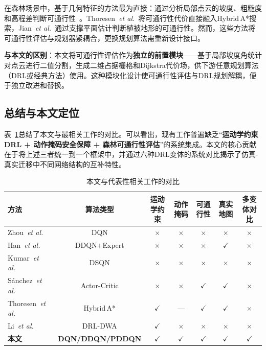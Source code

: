\documentclass[twocolumn]{elsarticle}
\newcommand{\etal}{\textit{et al.}}
\begin{document}
在森林场景中，基于几何特征的方法最为直接：通过分析局部点云的坡度、粗糙度和高程差判断可通行性~\cite{thoresen2021path,jian2024path}。Thoresen~\etal~\cite{thoresen2021path}将可通行性代价直接融入Hybrid\,A*搜索，Jian~\etal~\cite{jian2024path}通过支撑平面估计判断植被地形的可通行性。然而，这些方法将可通行性评估与规划器紧耦合，更换规划算法需重新设计接口。

\textbf{与本文的区别}：本文将可通行性评估作为\textbf{独立的前置模块}——基于局部坡度角统计对点云进行二值分割，生成二维占据栅格和Dijkstra代价场，供下游任意规划算法（DRL或经典方法）使用。这种模块化设计使可通行性评估与DRL规划解耦，便于独立改进和替换。

\subsection{总结与本文定位}

表~\ref{tab:related_comparison}总结了本文与最相关工作的对比。可以看出，现有工作普遍缺乏``\textbf{运动学约束DRL + 动作掩码安全保障 + 森林可通行性评估}''的系统集成。本文的核心贡献在于将上述三者统一到一个框架中，并通过六种DRL变体的系统对比揭示了仿真-真实迁移中不同网络结构的互补特性。

\begin{table}[t]
\centering
\caption{本文与代表性相关工作的对比}
\label{tab:related_comparison}
\footnotesize
\begin{tabular}{@{}lcccccc@{}}
\toprule
\textbf{方法} & \textbf{算法类型} & \textbf{运动学约束} & \textbf{动作掩码} & \textbf{可通行性} & \textbf{真实地图} & \textbf{多变体对比} \\
\midrule
Zhou~\etal~\cite{zhou2018dqn} & DQN & $\times$ & $\times$ & $\times$ & $\times$ & $\times$ \\
Han~\etal~\cite{han2023improved} & DDQN+Expert & $\times$ & $\times$ & $\times$ & $\checkmark$ & $\times$ \\
Kumar~\etal~\cite{kumar2025dsqn} & DSQN & $\times$ & $\times$ & $\times$ & $\times$ & $\times$ \\
S\'{a}nchez~\etal~\cite{sanchez2023rl} & Actor-Critic & $\times$ & $\times$ & $\checkmark$ & $\checkmark$ & $\times$ \\
Thoresen~\etal~\cite{thoresen2021path} & Hybrid\,A* & $\checkmark$ & --- & $\checkmark$ & $\checkmark$ & $\times$ \\
Li~\etal~\cite{li2025ugvdwa} & DRL-DWA & $\checkmark$ & $\times$ & $\times$ & $\times$ & $\times$ \\
\textbf{本文} & \textbf{DQN/DDQN/PDDQN} & $\checkmark$ & $\checkmark$ & $\checkmark$ & $\checkmark$ & $\checkmark$ \\
\bottomrule
\end{tabular}
\end{table}
\end{document}
